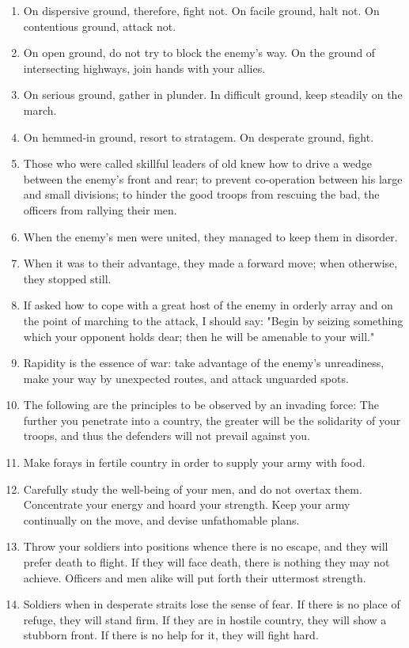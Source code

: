 \documentclass[oneside]{book}
\begin{document}
\begin{enumerate}
	\item On dispersive ground, therefore, fight not. On facile ground, halt not. On contentious ground, attack not.
	\item On open ground, do not try to block the enemy's way. On the ground of intersecting highways, join hands with your allies.
	\item On serious ground, gather in plunder. In difficult ground, keep steadily on the march.
	\item On hemmed-in ground, resort to stratagem. On desperate ground, fight.
	\item Those who were called skillful leaders of old knew how to drive a wedge between the enemy's front and rear; to prevent co-operation between his large and small divisions; to hinder the good troops from rescuing the bad, the officers from rallying their men.
	\item When the enemy's men were united, they managed to keep them in disorder.
	\item When it was to their advantage, they made a forward move; when otherwise, they stopped still.
	\item If asked how to cope with a great host of the enemy in orderly array and on the point of marching to the attack, I should say: "Begin by seizing something which your opponent holds dear; then he will be amenable to your will."
	\item Rapidity is the essence of war: take advantage of the enemy's unreadiness, make your way by unexpected routes, and attack unguarded spots.
	\item The following are the principles to be observed by an invading force: The further you penetrate into a country, the greater will be the solidarity of your troops, and thus the defenders will not prevail against you.
	\item Make forays in fertile country in order to supply your army with food.
	\item Carefully study the well-being of your men, and do not overtax them. Concentrate your energy and hoard your strength. Keep your army continually on the move, and devise unfathomable plans.
	\item Throw your soldiers into positions whence there is no escape, and they will prefer death to flight. If they will face death, there is nothing they may not achieve. Officers and men alike will put forth their uttermost strength.
	\item Soldiers when in desperate straits lose the sense of fear. If there is no place of refuge, they will stand firm. If they are in hostile country, they will show a stubborn front. If there is no help for it, they will fight hard.

\end{enumerate}
\end{document}
